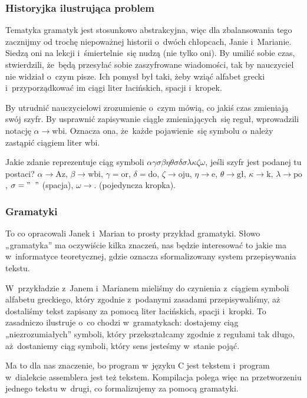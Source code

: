 \documentclass[10pt,t]{beamer}
\begin{document}
\begin{frame}
  \frametitle{Historyjka ilustrująca problem}


  Tematyka gramatyk jest stosunkowo abstrakcyjna, więc dla zbalansowania
  tego zacznijmy od trochę niepoważnej historii o~dwóch chłopcach, Janie
  i~Marianie. Siedzą oni na lekcji i~śmiertelnie~się nudzą (nie tylko oni).
  By umilić sobie czas, stwierdzili, że~będą przesyłać sobie zaszyfrowane
  wiadomości, tak by nauczyciel nie widział o~czym pisze. Ich pomysł był
  taki, żeby wziąć alfabet grecki i~przyporządkować im ciągi liter
  łacińskich, spacji i~kropek.

  By utrudnić nauczycielowi zrozumienie o~czym mówią, co jakiś czas
  zmieniają swój szyfr. By usprawnić zapisywanie ciągle zmieniających~się
  reguł, wprowadzili notację $\alpha \to \text{wbi}$. Oznacza ona, że~każde
  pojawienie~się symbolu $\alpha$ należy zastąpić ciągiem liter $\text{wbi}$.

  Jakie zdanie reprezentuje ciąg symboli
  $\alpha\gamma\sigma\beta\eta\theta\sigma\delta\sigma\lambda\kappa\zeta\omega$, jeśli szyfr jest podanej tu
  postaci? $\alpha \to \text{Az}$, $\beta \to \text{wbi}$, $\gamma = \text{or}$,
  $\delta = \text{do}$, $\zeta \to \text{oju}$, $\eta \to \text{e}$, $\theta \to \text{gł}$,
  $\kappa \to \text{k}$, $\lambda \to \text{po}$, $\sigma = "\;\;"$ (spacja),
  $\omega \to .$ (pojedyncza kropka).

\end{frame}





\begin{frame}
  \frametitle{Gramatyki}


  To co opracowali Janek i~Marian to prosty przykład gramatyki. Słowo
  „gramatyka” ma oczywiście kilka znaczeń, nas będzie interesować to jakie
  ma w~informatyce teoretycznej, gdzie oznacza sformalizowany system
  przepisywania tekstu.

  W~przykładzie z~Janem i~Marianem mieliśmy do czynienia z~ciągiem symboli
  alfabetu greckiego, który zgodnie z~podanymi zasadami przepisywaliśmy,
  aż dostaliśmy tekst zapisany za pomocą liter łacińskich, spacji i~kropki.
  To zasadniczo ilustruje o~co chodzi w~gramatykach: dostajemy ciąg
  „niezrozumiałych” symboli, który przekształcamy zgodnie z regułami tak
  długo, aż~dostaniemy ciąg symboli, który sens jesteśmy w~stanie pojąć.

  Ma to dla nas znaczenie, bo program w~języku C jest tekstem i~program
  w~dialekcie assemblera jest też tekstem. Kompilacja polega więc na
  przetworzeniu jednego tekstu w~drugi, co formalizujemy za pomocą
  gramatyki.

\end{frame}
\end{document}
